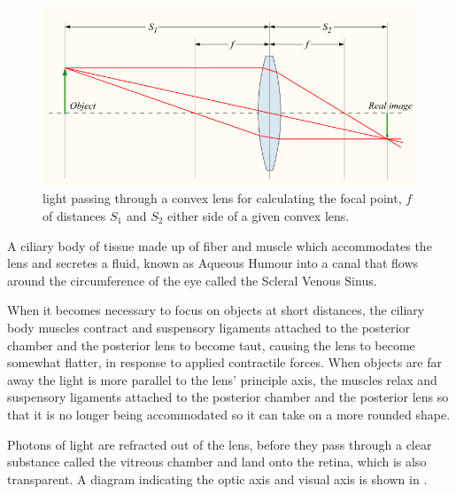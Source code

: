 \begin{figure}[htbp]
  \centering
    \includegraphics{figures/convergent_lens2}
  \caption{light passing through a convex lens for calculating the focal
  point, $f$ of distances $S_1$ and $S_2$ either side of a given convex lens.}
  \label{fig:convergent_lens}
\end{figure}

A ciliary body of tissue made up of fiber and muscle which accommodates the
lens and secretes a fluid, known as Aqueous Humour into a canal that flows
around the circumference of the eye called the Scleral Venous Sinus.
\cite{bill1970effects,dvorak1934schlemm}

When it becomes necessary to focus on objects at short distances, the
ciliary body muscles contract and suspensory ligaments attached to the
posterior chamber and the posterior lens to become taut, causing the
lens to become somewhat flatter, in response to applied contractile
forces. When objects are far away the light is more parallel to the lens'
principle axis, the muscles relax and suspensory ligaments attached to
the posterior chamber and the posterior lens so that it is no longer being
accommodated so it can take on a more rounded shape.

Photons of light are refracted out of the lens, before they pass through
a clear substance called the vitreous chamber and land onto the retina,
which is also transparent. A diagram indicating the optic axis and
visual axis is shown in .

